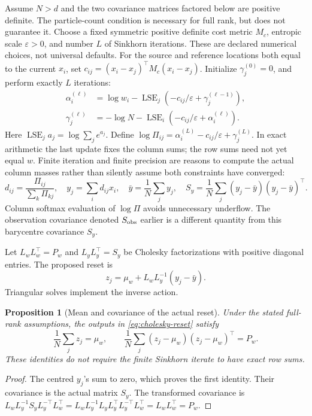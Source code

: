 \documentclass[11pt,a4paper]{article}
\newcommand{\lse}{\operatorname{LSE}}
\newtheorem{proposition}{Proposition}[section]
\begin{document}
Assume \(N>d\) and the two covariance matrices factored below are positive
definite. The particle-count condition is necessary for full rank, but does
not guarantee it. Choose a fixed symmetric positive definite cost metric
\(M_c\), entropic scale \(\varepsilon>0\), and number \(L\) of Sinkhorn
iterations. These are declared numerical choices, not universal defaults.
For the source and reference locations both equal to the current \(x_i\), set
\(c_{ij}=(x_i-x_j)^\top M_c(x_i-x_j)\).
Initialize \(\gamma_j^{(0)}=0\), and perform exactly \(L\) iterations:
\begin{align}
\label{eq:sinkhorn-iterations}
 \alpha_i^{(\ell)}
  &=\log w_i-\lse_j\!\left(-c_{ij}/\varepsilon+
                                 \gamma_j^{(\ell-1)}\right),\\
 \gamma_j^{(\ell)}
  &=-\log N-\lse_i\!\left(-c_{ij}/\varepsilon+
                                 \alpha_i^{(\ell)}\right).
 \nonumber
\end{align}
Here \(\lse_j a_j=\log\sum_j e^{a_j}\). Define
\(\log\Pi_{ij}=\alpha_i^{(L)}-c_{ij}/\varepsilon+\gamma_j^{(L)}\).
In exact arithmetic the last update fixes the column sums; the row sums
need not yet equal \(w\). Finite iteration and finite precision are reasons
to compute the actual column masses rather than silently assume both
constraints have converged:
\begin{equation}
\label{eq:actual-barycentres}
 d_{ij}=\frac{\Pi_{ij}}{\sum_k\Pi_{kj}},\quad
 y_j=\sum_i d_{ij}x_i,\quad
 \bar y=\frac1N\sum_j y_j,\quad
 S_y=\frac1N\sum_j(y_j-\bar y)(y_j-\bar y)^\top .
\end{equation}
Column softmax evaluation of \(\log\Pi\) avoids unnecessary underflow.
The observation covariance denoted \(S_{\rm obs}\) earlier is a different
quantity from this barycentre covariance \(S_y\).

Let \(L_wL_w^\top=P_w\) and \(L_yL_y^\top=S_y\) be Cholesky factorizations
with positive diagonal entries. The proposed reset is
\begin{equation}
\label{eq:cholesky-reset}
 z_j=\mu_w+L_wL_y^{-1}(y_j-\bar y).
\end{equation}
Triangular solves implement the inverse action.

\begin{proposition}[Mean and covariance of the actual reset]
Under the stated full-rank assumptions, the outputs in
\eqref{eq:cholesky-reset} satisfy
\begin{equation}
\label{eq:reset-covariance}
 \frac1N\sum_jz_j=\mu_w,\qquad
 \frac1N\sum_j(z_j-\mu_w)(z_j-\mu_w)^\top=P_w .
\end{equation}
These identities do not require the finite Sinkhorn iterate to have exact
row sums.
\end{proposition}
\begin{proof}
The centred \(y_j\)'s sum to zero, which proves the first identity.
Their covariance is the actual matrix \(S_y\). The transformed covariance is
\(L_wL_y^{-1}S_yL_y^{-\top}L_w^\top
 =L_wL_y^{-1}L_yL_y^\top L_y^{-\top}L_w^\top
 =L_wL_w^\top=P_w\).
\end{proof}
\end{document}
